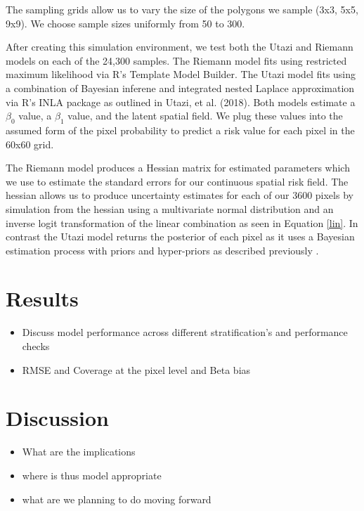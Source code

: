 \documentclass{article}
\begin{document}
The sampling grids allow us to vary the size of the polygons we sample (3x3, 5x5, 9x9). We choose sample sizes uniformly from 50 to 300.

After creating this simulation environment, we test both the Utazi and Riemann models on each of the 24,300 samples. The Riemann model fits using restricted maximum likelihood via R's Template Model Builder. The Utazi model fits using a combination of Bayesian inferene and integrated nested Laplace approximation via R's INLA package as outlined in Utazi, et al. (2018). Both models estimate a $\beta_0$ value, a  $\beta_1$ value, and the latent spatial field. We plug these values into the assumed form of the pixel probability to predict a risk value for each pixel in the 60x60 grid. 

The Riemann model produces a Hessian matrix for estimated parameters which we use to estimate the standard errors for our continuous spatial risk field. The hessian allows us to produce uncertainty estimates for each of our 3600 pixels by simulation from the hessian using a multivariate normal distribution and an inverse logit transformation of the linear combination as seen in Equation \ref{lin}. In contrast the Utazi model returns the posterior of each pixel as it uses a Bayesian estimation process with priors and hyper-priors as described previously \cite{Utazi2018a}.

\section{Results}\label{results}

\begin{itemize}
\item  Discuss model performance across different stratification's and performance checks
\item RMSE and Coverage at the pixel level and Beta bias
\end{itemize}

\section{Discussion}\label{discussion}

\begin{itemize}
\item What are the implications
\item where is thus model appropriate
\item what are we planning to do moving forward
\end{itemize}

\newpage



\end{document}
